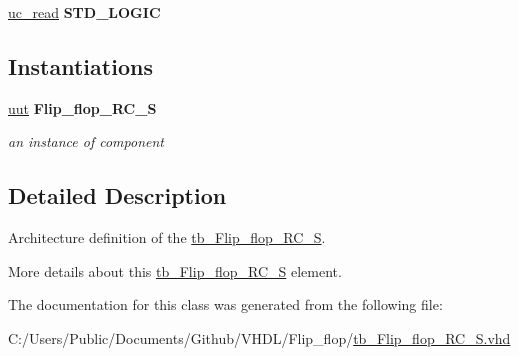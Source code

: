 \begin{DoxyCompactItemize}
\item 
\hyperlink{classtb___flip__flop___r_c___s_1_1_behavioral_a190dbf29a2d9cdf803fdac336c49cf66}{uc\+\_\+read} {\bfseries \textcolor{vhdlchar}{S\+T\+D\+\_\+\+L\+O\+G\+IC}\textcolor{vhdlchar}{ }} \hypertarget{classtb___flip__flop___r_c___s_1_1_behavioral_a190dbf29a2d9cdf803fdac336c49cf66}{}\label{classtb___flip__flop___r_c___s_1_1_behavioral_a190dbf29a2d9cdf803fdac336c49cf66}

\end{DoxyCompactItemize}
\subsection*{Instantiations}
 \begin{DoxyCompactItemize}
\item 
\hyperlink{classtb___flip__flop___r_c___s_1_1_behavioral_a1619316ad715601eb5d3559db829ac05}{uut}  {\bfseries Flip\+\_\+flop\+\_\+\+R\+C\+\_\+S}   \hypertarget{classtb___flip__flop___r_c___s_1_1_behavioral_a1619316ad715601eb5d3559db829ac05}{}\label{classtb___flip__flop___r_c___s_1_1_behavioral_a1619316ad715601eb5d3559db829ac05}

\begin{DoxyCompactList}\small\item\em an instance of component \end{DoxyCompactList}\end{DoxyCompactItemize}


\subsection{Detailed Description}
Architecture definition of the \hyperlink{classtb___flip__flop___r_c___s}{tb\+\_\+\+Flip\+\_\+flop\+\_\+\+R\+C\+\_\+S}. 

More details about this \hyperlink{classtb___flip__flop___r_c___s}{tb\+\_\+\+Flip\+\_\+flop\+\_\+\+R\+C\+\_\+S} element. 

The documentation for this class was generated from the following file\+:\begin{DoxyCompactItemize}
\item 
C\+:/\+Users/\+Public/\+Documents/\+Github/\+V\+H\+D\+L/\+Flip\+\_\+flop/\hyperlink{tb___flip__flop___r_c___s_8vhd}{tb\+\_\+\+Flip\+\_\+flop\+\_\+\+R\+C\+\_\+\+S.\+vhd}\end{DoxyCompactItemize}
